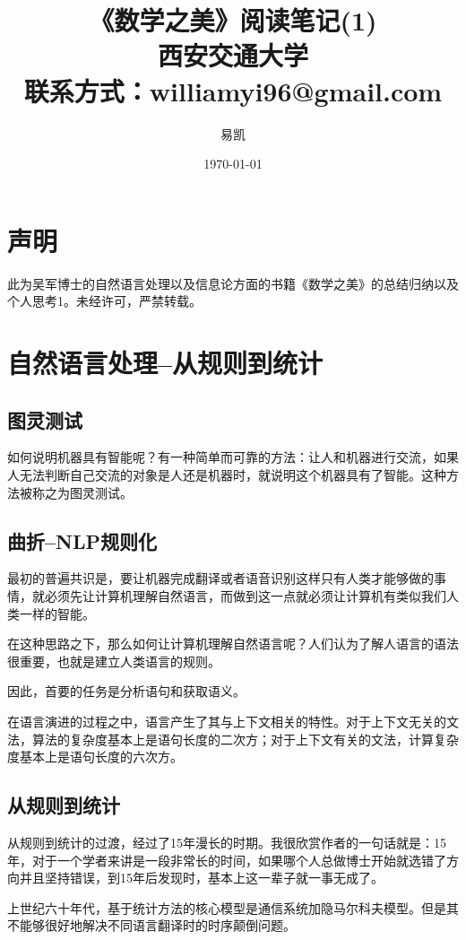 \documentclass[UTF8]{article}
\title{\Huge{《数学之美》阅读笔记(1)\\} \huge{西安交通大学 \\ 联系方式：williamyi96@gmail.com\\ }}
\author{\huge{易凯}}
\date{\Huge\today}
\begin{document}
	\maketitle
	\vspace{100mm}
	\newpage
	\tableofcontents
	\newpage

	\section{声明}
	此为吴军博士的自然语言处理以及信息论方面的书籍《数学之美》的总结归纳以及个人思考1。未经许可，严禁转载。

	\section{自然语言处理--从规则到统计}
	\subsection{图灵测试}
	如何说明机器具有智能呢？有一种简单而可靠的方法：让人和机器进行交流，如果人无法判断自己交流的对象是人还是机器时，就说明这个机器具有了智能。这种方法被称之为图灵测试。

	\subsection{曲折--NLP规则化}
	最初的普遍共识是，要让机器完成翻译或者语音识别这样只有人类才能够做的事情，就必须先让计算机理解自然语言，而做到这一点就必须让计算机有类似我们人类一样的智能。

	在这种思路之下，那么如何让计算机理解自然语言呢？人们认为了解人语言的语法很重要，也就是建立人类语言的规则。

	因此，首要的任务是分析语句和获取语义。

	在语言演进的过程之中，语言产生了其与上下文相关的特性。对于上下文无关的文法，算法的复杂度基本上是语句长度的二次方；对于上下文有关的文法，计算复杂度基本上是语句长度的六次方。

	\subsection{从规则到统计}
	从规则到统计的过渡，经过了15年漫长的时期。我很欣赏作者的一句话就是：15年，对于一个学者来讲是一段非常长的时间，如果哪个人总做博士开始就选错了方向并且坚持错误，到15年后发现时，基本上这一辈子就一事无成了。

	上世纪六十年代，基于统计方法的核心模型是通信系统加隐马尔科夫模型。但是其不能够很好地解决不同语言翻译时的时序颠倒问题。
\end{document}
